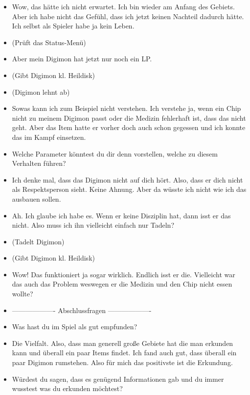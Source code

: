 {\begin{itemize}[]
    \item {} Wow, das hätte ich nicht erwartet. Ich bin wieder am Anfang des Gebiets. Aber ich habe nicht das Gefühl, dass ich jetzt keinen Nachteil dadurch hätte. Ich selbst als Spieler habe ja kein Leben. 
    \item {} (Prüft das Status-Menü)
    \item {} Aber mein Digimon hat jetzt nur noch ein LP.
    \item {} (Gibt Digimon \frq  kl. Heildisk\flq{})
    \item {} (Digimon lehnt ab)
    \item {} Sowas kann ich zum Beispiel nicht verstehen. Ich verstehe ja, wenn ein Chip nicht zu meinem Digimon passt oder die Medizin fehlerhaft ist, dass das nicht geht. Aber das Item hatte er vorher doch auch schon gegessen und ich konnte das im Kampf einsetzen.
    \item {} Welche Parameter könntest du dir denn vorstellen, welche zu diesem Verhalten führen?
    \item {} Ich denke mal, dass das Digimon nicht auf dich hört. Also, dass er dich nicht als Respektsperson sieht. Keine Ahnung. Aber da wüsste ich nicht wie ich das ausbauen sollen. 
    \item {} Ah. Ich glaube ich habe es. Wenn er keine Disziplin hat, dann isst er das nicht. Also muss ich ihn vielleicht einfach nur Tadeln?
    \item {} (Tadelt Digimon)
    \item {} (Gibt Digimon \frq  kl. Heildisk\flq{})
    \item {} Wow! Das funktioniert ja sogar wirklich. Endlich isst er die. Vielleicht war das auch das Problem weswegen er die Medizin und den Chip nicht essen wollte?
    \item {-------------------} Abschlussfragen {-------------------}
    \item {} Was hast du im Spiel als gut empfunden?
    \item {} Die Vielfalt. Also, dass man generell große Gebiete hat die man erkunden kann und überall ein paar Items findet. Ich fand auch gut, dass überall ein paar Digimon rumstehen. Also für mich das positivste ist die Erkundung.
    \item {} Würdest du sagen, dass es genügend Informationen gab und du immer wusstest was du erkunden möchtest?

\end{itemize}}

